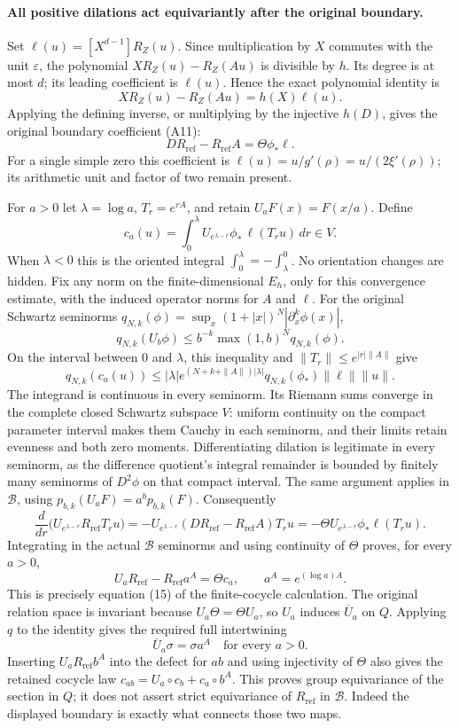 \documentclass[10pt,a4paper,oneside]{report}
\begin{document}
\paragraph{All positive dilations act equivariantly after the original boundary.}
Set \(\ell(u)=[X^{d-1}]R_Z(u)\). Since multiplication by \(X\) commutes
with the unit \(\varepsilon\), the polynomial
\(XR_Z(u)-R_Z(Au)\) is divisible by \(h\). Its degree is at most \(d\);
its leading coefficient is \(\ell(u)\). Hence the exact polynomial
identity is
\[
 XR_Z(u)-R_Z(Au)=h(X)\ell(u).
\]
Applying the defining inverse, or multiplying by the injective
\(h(D)\), gives the original boundary coefficient (A11):
\[
 DR_{\mathrm{ref}}-R_{\mathrm{ref}}A=\Theta\phi_*\ell.
\]
For a single simple zero this coefficient is
\(\ell(u)=u/g'(\rho)=u/(2\xi'(\rho))\); its arithmetic unit and factor
of two remain present.

For \(a>0\) let \(\lambda=\log a\), \(T_r=e^{rA}\), and retain
\(U_aF(x)=F(x/a)\). Define
\[
 c_a(u)=\int_0^\lambda
 U_{e^{\lambda-r}}\phi_*\,\ell(T_ru)\,dr\in V.
\]
When \(\lambda<0\) this is the oriented integral
\(\int_0^\lambda=-\int_\lambda^0\). No orientation changes are hidden.
Fix any norm on the finite-dimensional \(E_h\), only for this convergence
estimate, with the induced operator norms for \(A\) and \(\ell\).
For the original Schwartz seminorms
\(q_{N,k}(\phi)=\sup_x(1+|x|)^N|\partial_x^k\phi(x)|\),
\[
 q_{N,k}(U_b\phi)\leq b^{-k}\max(1,b)^Nq_{N,k}(\phi).
\]
On the interval between 0 and \(\lambda\), this inequality and
\(\|T_r\|\leq e^{|r|\|A\|}\) give
\[
 q_{N,k}(c_a(u))\leq
 |\lambda|e^{(N+k+\|A\|)|\lambda|}
 q_{N,k}(\phi_*)\|\ell\|\|u\|.
\]
The integrand is continuous in every seminorm. Its Riemann sums converge
in the complete closed Schwartz subspace \(V\): uniform continuity on
the compact parameter interval makes them Cauchy in each seminorm,
and their limits retain evenness and both zero moments. Differentiating
dilation is legitimate in every seminorm, as the difference quotient's
integral remainder is bounded by finitely many seminorms of
\(D^2\phi\) on that compact interval. The same argument applies in
\(\mathscr B\), using \(p_{b,k}(U_aF)=a^bp_{b,k}(F)\).
Consequently
\[
 \frac{d}{dr}\bigl(U_{e^{\lambda-r}}R_{\mathrm{ref}}T_ru\bigr)
 =-U_{e^{\lambda-r}}
   (DR_{\mathrm{ref}}-R_{\mathrm{ref}}A)T_ru
 =-\Theta U_{e^{\lambda-r}}\phi_*\ell(T_ru).
\]
Integrating in the actual \(\mathscr B\) seminorms and using continuity
of \(\Theta\) proves, for every \(a>0\),
\[
 U_aR_{\mathrm{ref}}-R_{\mathrm{ref}}a^A=\Theta c_a,
 \qquad a^A=e^{(\log a)A}.
\]
This is precisely equation (15) of the finite-cocycle calculation.
The original relation space is invariant because
\(U_a\Theta=\Theta U_a\), so \(U_a\) induces \(\overline U_a\) on \(Q\).
Applying \(q\) to the identity gives the required full intertwining
\[
 \boxed{\overline U_a\sigma=\sigma a^A\quad\text{for every }a>0.}
\]
Inserting \(U_aR_{\mathrm{ref}}b^A\) into the defect for \(ab\)
and using injectivity of \(\Theta\) also gives the retained cocycle law
\(c_{ab}=U_a\circ c_b+c_a\circ b^A\).
This proves group equivariance of the section in \(Q\); it does not
assert strict equivariance of \(R_{\mathrm{ref}}\) in \(\mathscr B\).
Indeed the displayed boundary is exactly what connects those two maps.
\end{document}
